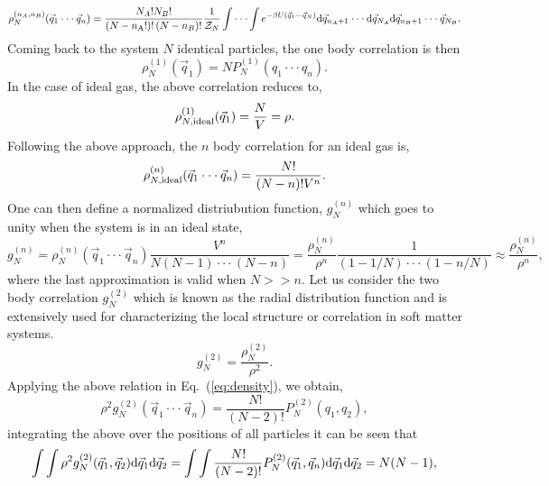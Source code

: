 \documentclass[a4paper]{article}
\begin{document}
\begin{equation}
\rho^{(n_{A},n_{B})}_{N}(\vec{q}_{1}\cdot\cdot\cdot \vec{q}_{n})=\frac{N_{A}!N_{B}!}{\left(N-n_{\rm A}!\right)!\left(N-n_{B}\right)!}\frac{1}{\mathcal{Z}_{N}}\int\cdot\cdot\cdot\int e^{-\beta U(\vec{q}_{1}\cdot\cdot\cdot \vec{q}_{N})}{\rm d}\vec{q}_{n_{A}+1}\cdot\cdot\cdot{\rm d}\vec{q}_{N_{A}}{\rm d}\vec{q}_{n_{B}+1}\cdot\cdot\cdot\vec{q}_{N_{B}}.
\end{equation}
Coming back to the system $N$ identical particles, the one body correlation is then
\begin{equation}
\rho^{(1)}_{N}(\vec{q}_{1})=N P^{(1)}_{N}(q_{1}\cdot\cdot\cdot q_{n}).
\end{equation}
In the case of ideal gas, the above correlation reduces to,
\begin{equation}
\rho^{(1)}_{N, {\rm ideal}}(\vec{q}_{1})=\frac{N}{V}=\rho.
\end{equation}
Following the above approach, the $n$ body correlation for an ideal gas is,
\begin{equation}
\rho^{(n)}_{N,{\rm ideal}}(\vec{q}_{1}\cdot\cdot\cdot \vec{q}_{n})=\frac{N!}{(N-n)!V^{n}}.
\end{equation}
One can then define a normalized distriubution function, $g^{(n)}_{N}$ which goes to unity when the system is in an ideal state,
\begin{equation}
g^{(n)}_{N}=\rho^{(n)}_{N}(\vec{q}_{1}\cdot\cdot\cdot \vec{q}_{n})\frac{V^{n}}{N(N-1)\cdot\cdot\cdot(N-n)}=\frac{\rho^{(n)}_{N}}{\rho^{n}}\frac{1}{(1-1/N)\cdot\cdot\cdot(1-n/N)}\approx\frac{\rho^{(n)}_{N}}{\rho^{n}},
\end{equation}
where the last approximation is valid when $N>>n$. Let us consider the two body correlation $g^{(2)}_{N}$ which is known as the radial distribution function and is extensively used for characterizing the local structure or correlation in soft matter systems.
\begin{equation}
g^{(2)}_{N}=\frac{\rho^{(2)}_{N}}{\rho^{2}}.
\end{equation}
Applying the above relation in Eq.~(\ref{eq:density}), we obtain,
\begin{equation}
\rho^{2}g^{(2)}_{N}(\vec{q}_{1}\cdot\cdot\cdot \vec{q}_{n})=\frac{N!}{\left(N-2\right)!}P^{(2)}_{N}(q_{1},q_{2}),
\end{equation}
integrating the above over the positions of all particles it can be seen that
\begin{equation}
\int\int\rho^{2}g^{(2)}_{N}(\vec{q}_{1},\vec{q}_{2}){\rm d}\vec{q}_{1}{\rm d}\vec{q}_{2}=\int\int\frac{N!}{\left(N-2\right)!}P^{(2)}_{N}(\vec{q}_{1},\vec{q}_{n}){\rm d}\vec{q}_{1}{\rm d}\vec{q}_{2}=N(N-1),
\end{equation}
\end{document}
